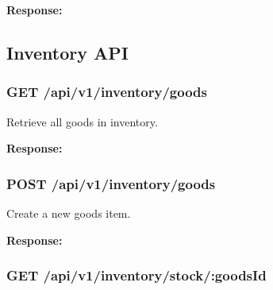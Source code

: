 \textbf{Response:}

\begin{Shaded}
\begin{Highlighting}[]
\FunctionTok{\{}
  \FunctionTok{:} \FunctionTok{,}
  \FunctionTok{:} \FunctionTok{,}
  \FunctionTok{:} 
\FunctionTok{\}}
\end{Highlighting}
\end{Shaded}

\subsection{Inventory API}\label{inventory-api}

\subsubsection{GET
/api/v1/inventory/goods}\label{get-apiv1inventorygoods}

Retrieve all goods in inventory.

\textbf{Response:}

\begin{Shaded}
\begin{Highlighting}[]
\FunctionTok{\{}
  \FunctionTok{:} \FunctionTok{,}
  \FunctionTok{:} \OtherTok{[]}
\FunctionTok{\}}
\end{Highlighting}
\end{Shaded}

\subsubsection{POST
/api/v1/inventory/goods}\label{post-apiv1inventorygoods}

Create a new goods item.

\textbf{Response:}

\begin{Shaded}
\begin{Highlighting}[]
\FunctionTok{\{}
  \FunctionTok{:} \FunctionTok{,}
  \FunctionTok{:} 
\FunctionTok{\}}
\end{Highlighting}
\end{Shaded}

\subsubsection{GET
/api/v1/inventory/stock/:goodsId}\label{get-apiv1inventorystockgoodsid}

